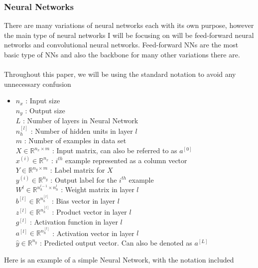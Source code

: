 \subsubsection{Neural Networks}
There are many variations of neural networks each with its own purpose, however the main type of neural networks I will be focusing on will be feed-forward neural networks and convolutional neural networks. Feed-forward NNs are the most basic type of NNs and also the backbone for many other variations there are. 
\\ \\
Throughout this paper, we will be using the standard notation to avoid any unnecessary confusion
\\
\begin{itemize}
\centering
\item[] 
$n_x$ : Input size \\
$n_y$ : Output size \\
$L$ : Number of layers in Neural Network \\
$n^{[l]}_h$ : Number of hidden units in layer $l$ \\
$m$ : Number of examples in data set \\
$X \in \mathbb{R}^{n_x \times m}$ : Input matrix, can also be referred to as $a^{[0]}$ \\
$x^{(i)} \in \mathbb{R}^{n_x}$ : $i^{th}$ example represented as a column vector \\
$Y \in \mathbb{R}^{n_y \times m}$ : Label matrix for $X$ \\
$y^{(i)} \in \mathbb{R}^{n_y}$ : Output label for the $i^{th}$ example \\
$W^{l} \in \mathbb{R}^{n_h^{l-1} \times n_h^{l}}$ : Weight matrix in layer $l$ \\
$b^{[l]} \in \mathbb{R}^{n^{[l]}_h}$ : Bias vector in layer $l$ \\
$z^{[l]} \in \mathbb{R}^{n^{[l]}_h}$ : Product vector in layer $l$ \\
$g^{[l]}$ : Activation function in layer $l$ \\
$a^{[l]} \in \mathbb{R}^{n^{[l]}_h}$ : Activation vector in layer $l$ \\
$\hat{y} \in \mathbb{R}^{n_y}$ : Predicted output vector. Can also be denoted as $a^{[L]}$
\end{itemize}

Here is an example of a simple Neural Network, with the notation included

